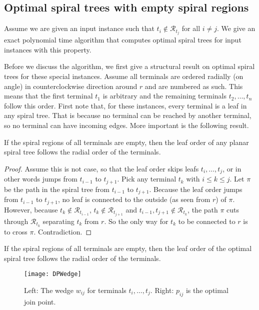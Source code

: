 \documentclass{journalA4}
\begin{document}
\subsection{Optimal spiral trees with empty spiral regions} \label{sec:emptyregions}

Assume we are given an input instance such that $t_i \notin \mathcal{R}_{t_j}$ for all $i \neq j$. We give an exact polynomial time algorithm that computes optimal spiral trees for input instances with this property.

Before we discuss the algorithm, we first give a structural result on optimal spiral trees for these special instances. Assume all terminals are ordered radially (on angle) in counterclockwise direction around $r$ and are numbered as such. This means that the first terminal $t_1$ is arbitrary and the remaining terminals $t_2, \ldots, t_n$ follow this order. First note that, for these instances, every terminal is a leaf in any spiral tree. That is because no terminal can be reached by another terminal, so no terminal can have incoming edges. More important is the following result.

\begin{lemma}
\label{lem:DPleaforder}
If the spiral regions of all terminals are empty, then the leaf order of any planar spiral tree follows the radial order of the terminals.
\end{lemma}
\begin{proof}
Assume this is not case, so that the leaf order skips leafs $t_i, \ldots, t_j$, or in other words jumps from $t_{i-1}$ to $t_{j+1}$. Pick any terminal $t_k$ with $i \leq k \leq j$. Let $\pi$ be the path in the spiral tree from $t_{i-1}$ to $t_{j+1}$. Because the leaf order jumps from $t_{i-1}$ to $t_{j+1}$, no leaf is connected to the outside (as seen from $r$) of $\pi$. However, because $t_k \notin \mathcal{R}_{t_{i-1}}$, $t_k \notin \mathcal{R}_{t_{j+1}}$ and $t_{i-1}, t_{j+1} \notin \mathcal{R}_{t_{k}}$, the path $\pi$ cuts through $\mathcal{R}_{t_{k}}$ separating $t_k$ from $r$. So the only way for $t_k$ to be connected to $r$ is to cross $\pi$. Contradiction.
\end{proof}

\begin{cor}
If the spiral regions of all terminals are empty, then the leaf order of the optimal spiral tree follows the radial order of the terminals.
\end{cor}

\begin{figure}[b]
  \centering
  \texttt{[image: DPWedge]}
  \caption{Left: The wedge $w_{ij}$ for terminals $t_i, \ldots, t_j$. Right: $p_{ij}$ is the optimal join point.}
  \label{fig:DPWedge}
\end{figure}
\end{document}
